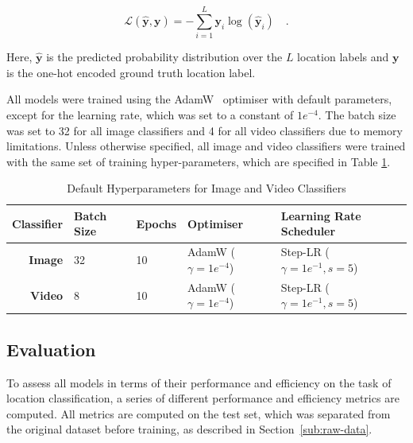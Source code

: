 \documentclass[a4paper]{article}
\begin{document}
  \begin{equation}
    \mathcal{L}(\hat{\mathbf{y}},\mathbf{y}) = -\sum_{i=1}^{L} \mathbf{y}_i
    \log(\hat{\mathbf{y}}_i) \quad .
    \label{eq:cross-entropy}
  \end{equation}


  Here, $\hat{\mathbf{y}}$ is the predicted probability distribution over the $L$
  location labels and $\mathbf{y}$ is the one-hot encoded ground truth location
  label. 

  All models were trained using the AdamW~\cite{adamw} optimiser with default
  parameters, except for the learning rate, which was set to a constant of
  $1e^{-4}$. The batch size was set to 32 for all image classifiers and 4 for
  all video classifiers due to memory limitations. Unless otherwise specified,
  all image and video classifiers were trained with the same set of training
  hyper-parameters, which are specified in Table \ref{tab:default-hyperparams}. 

  \begin{table}[ht]
    \centering
    \begin{tabular}{rllll}
      \toprule
      Classifier & Batch Size & Epochs & Optimiser & Learning Rate Scheduler \\
      \midrule
      \bfseries Image & 32 & 10 & AdamW ($\gamma=1e^{-4}$) & Step-LR
      ($\gamma=1e^{-1}, s=5$) \\
      \bfseries Video & 8 & 10 & AdamW ($\gamma=1e^{-4}$) & Step-LR
      ($\gamma=1e^{-1}, s=5$) \\
      \bottomrule
    \end{tabular}
    \caption{Default Hyperparameters for Image and Video Classifiers}
    \label{tab:default-hyperparams}
  \end{table}


  \subsection{Evaluation} %
  \label{sub:evaluation}

  To assess all models in terms of their performance and efficiency on the task
  of location classification, a series of different performance and efficiency
  metrics are computed. All metrics are computed on the test set, which was
  separated from the original dataset before training, as described in
  Section~\ref{sub:raw-data}.
\end{document}
